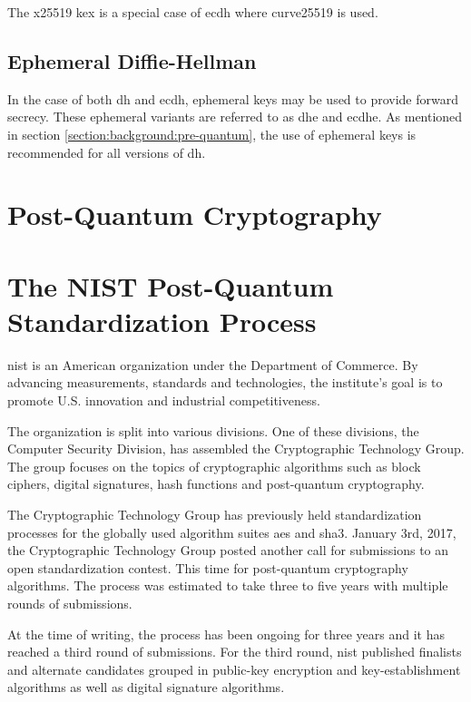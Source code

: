 The \gls{x25519} \gls{kex} is a special case of \gls{ecdh} where \gls{curve25519} is used\cite{rfc7748}. 

\subsection{Ephemeral Diffie-Hellman}

In the case of both \gls{dh} and \gls{ecdh}, ephemeral keys may be used to provide forward secrecy. These ephemeral variants are referred to as \gls{dhe} and \gls{ecdhe}. As mentioned in section \ref{section:background:pre-quantum}, the use of ephemeral keys is recommended for all versions of \gls{dh}.

\section{Post-Quantum Cryptography}


\section{The NIST Post-Quantum Standardization Process}
\gls{nist} is an American organization under the Department of Commerce. By advancing measurements, standards and technologies, the institute's goal is to promote U.S. innovation and industrial competitiveness\cite{nist:about}.

The organization is split into various divisions. One of these divisions, the Computer Security Division, has assembled the Cryptographic Technology Group. The group focuses on the topics of cryptographic algorithms such as block ciphers, digital signatures, hash functions and post-quantum cryptography\cite{nist:ct}.

The Cryptographic Technology Group has previously held standardization processes for the globally used algorithm suites \gls{aes} and \gls{sha3}. January 3rd, 2017, the Cryptographic Technology Group posted another call for submissions to an open standardization contest. This time for post-quantum cryptography algorithms. The process was estimated to take three to five years with multiple rounds of submissions\cite{nist:call-for-proposals}.

At the time of writing, the process has been ongoing for three years and it has reached a third round of submissions. For the third round, \gls{nist} published finalists and alternate candidates grouped in public-key encryption and key-establishment algorithms as well as digital signature algorithms\cite{nist:round-three-submissions}.

